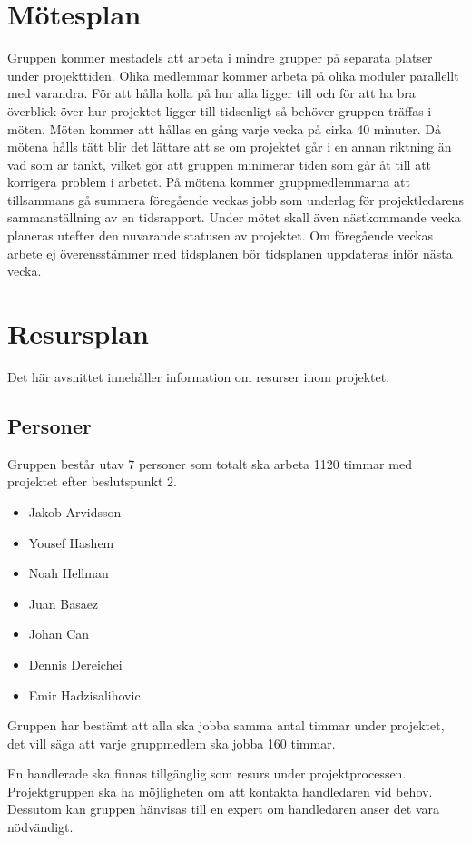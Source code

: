 \documentclass[projektplan/plan.tex]{subfiles}
\begin{document}
\section{Mötesplan}
Gruppen kommer mestadels att arbeta i mindre grupper på separata platser under
projekttiden. Olika medlemmar kommer arbeta på olika moduler parallellt med
varandra. För att hålla kolla på hur alla ligger till och för att ha bra
överblick över hur projektet ligger till tidsenligt så behöver gruppen träffas
i möten. Möten kommer att hållas en gång varje vecka på cirka 40 minuter. Då
mötena hålls tätt blir det lättare att se om projektet går i en annan riktning
än vad som är tänkt, vilket gör att gruppen minimerar tiden som går åt till att
korrigera problem i arbetet. På mötena kommer gruppmedlemmarna att tillsammans
gå summera föregående veckas jobb som underlag för projektledarens
sammanställning av en tidsrapport. Under mötet skall även nästkommande vecka
planeras utefter den nuvarande statusen av projektet. Om föregående veckas
arbete ej överensstämmer med tidsplanen bör tidsplanen uppdateras inför nästa
vecka.

\section{Resursplan}
Det här avsnittet innehåller information om resurser inom projektet.

\subsection{Personer}
Gruppen består utav 7 personer som totalt ska arbeta 1120 timmar med projektet
efter beslutspunkt 2.

\begin{itemize}
    \item Jakob Arvidsson
    \item Yousef Hashem
    \item Noah Hellman
    \item Juan Basaez
    \item Johan Can
    \item Dennis Dereichei
    \item Emir Hadzisalihovic
\end{itemize}
Gruppen har bestämt att alla ska jobba samma antal timmar under projektet, det
vill säga att varje gruppmedlem ska jobba 160 timmar.

En handlerade ska finnas tillgänglig som resurs under projektprocessen.
Projektgruppen ska ha möjligheten om att kontakta handledaren vid behov.
Dessutom kan gruppen hänvisas till en expert om handledaren anser det vara
nödvändigt.
\end{document}
